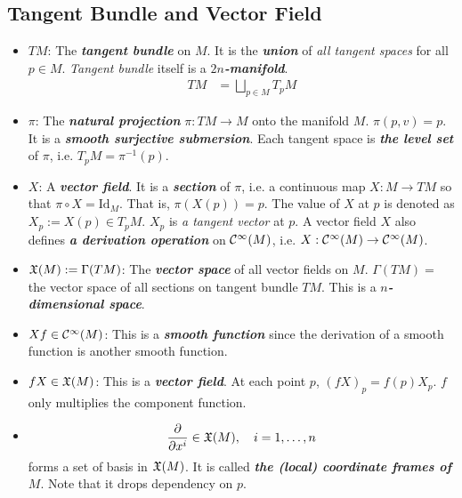 \documentclass[11pt]{article}
\begin{document}
\subsection{Tangent Bundle and Vector Field}
\begin{itemize}
\item $TM$: \quad The \emph{\textbf{tangent bundle}} on $M$. It is the \emph{\textbf{union}} of \emph{all tangent spaces} for all $p\in M$. \emph{Tangent bundle} itself is a \emph{\textbf{$2n$-manifold}}.
\begin{align*}
TM &= \bigsqcup_{p\in M}T_pM
\end{align*}

\item $\pi$: \quad The \emph{\textbf{natural projection}} $\pi: TM \rightarrow M$ onto the manifold $M$.  $\pi(p, v) = p$. It is a \emph{\textbf{smooth surjective submersion}}. Each tangent space is \emph{\textbf{the level set}} of $\pi$, i.e. $T_pM = \pi^{-1}(p)$.

\item $X$: \quad A \emph{\textbf{vector field}}. It is a \emph{\textbf{section}} of $\pi$, i.e. a continuous map $X: M \rightarrow TM$ so that $\pi \circ X = \text{Id}_{M}$. That is, $\pi(X(p)) = p$. The value of $X$ at $p$ is denoted as $X_p := X(p) \in T_pM$. $X_p$ is \emph{a tangent vector} at $p$. A vector field $X$ also defines \emph{\textbf{a derivation operation}} on ${\mathcal C}^{\infty}(M)$, i.e. $X: {\mathcal C}^{\infty}(M) \rightarrow {\mathcal C}^{\infty}(M)$.

\item ${\mathfrak X}(M):= \Gamma(TM)$: \quad The \emph{\textbf{vector space}} of all vector fields on $M$. $\Gamma(TM)=$  the vector space of all sections on tangent bundle $TM$. This is a \emph{\textbf{$n$-dimensional space}}.

\item $Xf \in {\mathcal C}^{\infty}(M)$: \quad This is a \emph{\textbf{smooth function}} since the derivation of a smooth function is another smooth function. 

\item $fX \in {\mathfrak X}(M)$: \quad This is a \emph{\textbf{vector field}}. At each point $p$, $(fX)_p = f(p)X_p$. $f$ only multiplies the component function.

\item \begin{align*}
\dfrac{\partial}{\partial x^{i}} \in {\mathfrak X}(M), \quad i=1,\ldots, n
\end{align*} forms a set of basis in ${\mathfrak X}(M)$. It is called \emph{\textbf{the (local) coordinate frames of $M$}}. Note that it drops dependency on $p$.


\end{itemize}
\end{document}
